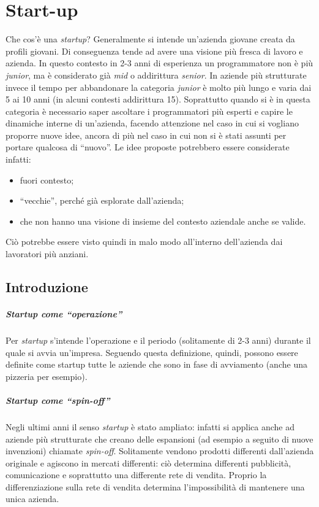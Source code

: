\chapter{Start-up}

Che cos'è una \textit{startup}? Generalmente si intende un'azienda giovane
creata da profili giovani. Di conseguenza tende ad avere una visione più
fresca di lavoro e azienda. In questo contesto in 2-3 anni di esperienza
un programmatore non è più \textit{junior}, ma è considerato già \textit{mid}
o addirittura \textit{senior}. In aziende più strutturate invece il tempo
per abbandonare la categoria \textit{junior} è molto più lungo e varia dai 5
ai 10 anni (in alcuni contesti addirittura 15). Soprattutto quando si è in
questa categoria è necessario saper ascoltare i programmatori più esperti e
capire le dinamiche interne di un'azienda, facendo attenzione nel caso in
cui si vogliano proporre nuove idee, ancora di più nel caso in cui non si è
stati assunti per portare qualcosa di ``nuovo''. Le idee proposte potrebbero
essere considerate infatti:
\begin{itemize}
  \item fuori contesto;
  \item ``vecchie'', perché già esplorate dall'azienda;
  \item che non hanno una visione di insieme del contesto aziendale anche se
  valide.
\end{itemize}
Ciò potrebbe essere visto quindi in malo modo all'interno dell'azienda dai
lavoratori più anziani.

\section{Introduzione}

\paragraph*{Startup come ``operazione''} Per \textit{startup} s'intende
l'operazione e il periodo (solitamente di 2-3 anni) durante il quale si avvia
un'impresa. Seguendo questa definizione, quindi, possono essere definite come
startup tutte le aziende che sono in fase di avviamento (anche una pizzeria per 
esempio).

\paragraph*{Startup come ``spin-off''}
Negli ultimi anni il senso \textit{startup} è stato ampliato: infatti si
applica anche ad aziende più strutturate che creano delle espansioni (ad
esempio a seguito di nuove invenzioni) chiamate \textit{spin-off}. Solitamente
vendono prodotti differenti dall'azienda originale e agiscono in mercati
differenti: ciò determina differenti pubblicità, comunicazione e soprattutto
una differente rete di vendita. Proprio la differenziazione sulla rete di
vendita determina l'impossibilità di mantenere una unica azienda.

